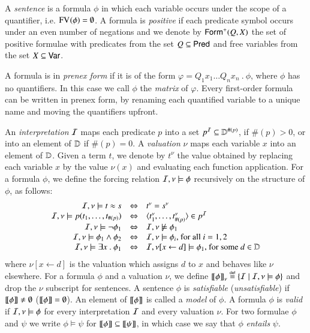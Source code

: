 \documentclass{llncs}
\begin{document}
A \emph{sentence} is a formula $\phi$ in which each variable occurs
under the scope of a quantifier, i.e. $\mathrm{FV}_{}(\phi) = \emptyset$.  A
formula is \emph{positive} if each predicate symbol occurs under an
even number of negations and we denote by $\mathsf{Form}^+(Q,X)$ the set of
positive formulae with predicates from the set $Q \subseteq \mathsf{Pred}$
and free variables from the set $X \subseteq \mathsf{Var}$.

A formula is in \emph{prenex form} if it is of the form $\varphi =
Q_1x_1 \ldots Q_nx_n ~.~ \phi$, where $\phi$ has no quantifiers. In
this case we call $\phi$ the \emph{matrix} of $\varphi$. Every
first-order formula can be written in prenex form, by renaming each
quantified variable to a unique name and moving the quantifiers
upfront.


An \emph{interpretation} $\mathcal{I}$ maps each predicate $p$ into a set $p^{\mathcal{I}}
\subseteq \mathbb{D}^{\#(p)}$, if $\#(p)>0$, or into an element of $\mathbb{D}$
if $\#(p)=0$. A \emph{valuation} $\nu$ maps each variable $x$ into an
element of $\mathbb{D}$. Given a term $t$, we denote by $t^\nu$ the value
obtained by replacing each variable $x$ by the value $\nu(x)$ and
evaluating each function application. For a formula $\phi$, we define
the forcing relation $\mathcal{I},\nu \models \phi$ recursively on the
structure of $\phi$, as follows:
\[
\begin{array}{rcl}
\mathcal{I},\nu \models t \approx s & \Leftrightarrow & t^\nu=s^\nu \\
\mathcal{I},\nu \models p(t_1,\ldots,t_{\#(p)}) & \Leftrightarrow & \langle t_1^\nu,\ldots,t_{\#(p)}^\nu \rangle \in p^{\mathcal{I}} \\
\mathcal{I},\nu \models \neg\phi_1 & \Leftrightarrow & \mathcal{I},\nu \not\models \phi_1 \\
\mathcal{I},\nu \models \phi_1 \wedge \phi_2 & \Leftrightarrow & \mathcal{I},\nu \models \phi_i \text{, for all } i=1,2 \\ 
\mathcal{I},\nu \models \exists x ~.~ \phi_1 & \Leftrightarrow & \mathcal{I},\nu[x\leftarrow d] \models \phi_1 \text{, for some } d \in \mathbb{D} 
\end{array}
\]
where $\nu[x\leftarrow d]$ is the valuation which assigns $d$ to $x$
and behaves like $\nu$ elsewhere. For a formula $\phi$ and a valuation
$\nu$, we define ${\bf [\![} \phi {\bf ]\!]}_\nu \stackrel{\scriptscriptstyle{\mathsf{def}}}{=} \{ \mathcal{I} \mid \mathcal{I},\nu \models
  \phi \}$ and drop the $\nu$ subscript for sentences. A sentence $\phi$
is \emph{satisfiable} (\emph{unsatisfiable}) if
${\bf [\![} \phi {\bf ]\!]}\neq\emptyset$ (${\bf [\![} \phi {\bf ]\!]}=\emptyset$). An element of
${\bf [\![} \phi {\bf ]\!]}$ is called a \emph{model} of $\phi$. A formula $\phi$ is
\emph{valid} if $\mathcal{I},\nu \models \phi$ for every interpretation $\mathcal{I}$
and every valuation $\nu$. For two formulae $\phi$ and $\psi$ we write
$\phi \models \psi$ for ${\bf [\![} \phi {\bf ]\!]} \subseteq {\bf [\![} \psi {\bf ]\!]}$, in which
case we say that $\phi$ \emph{entails} $\psi$. 
\end{document}
